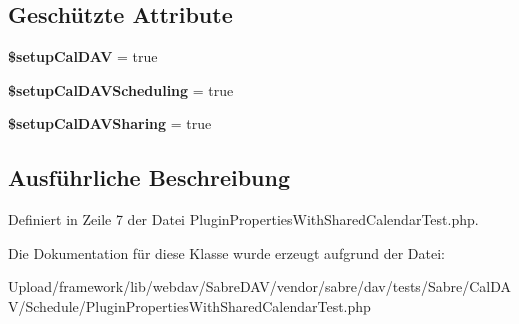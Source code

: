 \subsection*{Geschützte Attribute}
\begin{DoxyCompactItemize}
\item 
\mbox{\label{class_sabre_1_1_cal_d_a_v_1_1_schedule_1_1_plugin_properties_with_shared_calendar_test_a537e180cf327957362f434ad96e5e3ac}} 
{\bfseries \$setup\+Cal\+D\+AV} = true
\item 
\mbox{\label{class_sabre_1_1_cal_d_a_v_1_1_schedule_1_1_plugin_properties_with_shared_calendar_test_ab079aa0ef058f7af315bad7b8c528071}} 
{\bfseries \$setup\+Cal\+D\+A\+V\+Scheduling} = true
\item 
\mbox{\label{class_sabre_1_1_cal_d_a_v_1_1_schedule_1_1_plugin_properties_with_shared_calendar_test_a0c2ef89ff93ae6621a23466d516f4524}} 
{\bfseries \$setup\+Cal\+D\+A\+V\+Sharing} = true
\end{DoxyCompactItemize}


\subsection{Ausführliche Beschreibung}


Definiert in Zeile 7 der Datei Plugin\+Properties\+With\+Shared\+Calendar\+Test.\+php.



Die Dokumentation für diese Klasse wurde erzeugt aufgrund der Datei\+:\begin{DoxyCompactItemize}
\item 
Upload/framework/lib/webdav/\+Sabre\+D\+A\+V/vendor/sabre/dav/tests/\+Sabre/\+Cal\+D\+A\+V/\+Schedule/Plugin\+Properties\+With\+Shared\+Calendar\+Test.\+php\end{DoxyCompactItemize}
